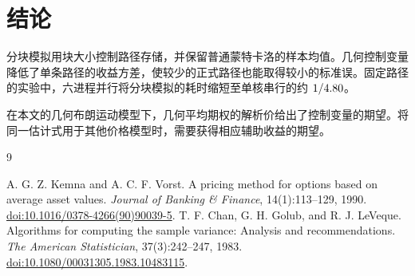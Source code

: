 \FloatBarrier
\section{结论}
分块模拟用块大小控制路径存储，并保留普通蒙特卡洛的样本均值。几何控制变量降低了单条路径的收益方差，使较少的正式路径也能取得较小的标准误。固定路径的实验中，六进程并行将分块模拟的耗时缩短至单核串行的约 \(1/4.80\)。

在本文的几何布朗运动模型下，几何平均期权的解析价给出了控制变量的期望。将同一估计式用于其他价格模型时，需要获得相应辅助收益的期望。

\begin{thebibliography}{9}\small\raggedright
{}
A. G. Z. Kemna and A. C. F. Vorst.
A pricing method for options based on average asset values.
\textit{Journal of Banking \& Finance}, 14(1):113--129, 1990.
\href{https://doi.org/10.1016/0378-4266(90)90039-5}{doi:10.1016/0378-4266(90)90039-5}.
T. F. Chan, G. H. Golub, and R. J. LeVeque.
Algorithms for computing the sample variance: Analysis and recommendations.
\textit{The American Statistician}, 37(3):242--247, 1983.
\href{https://doi.org/10.1080/00031305.1983.10483115}{doi:10.1080/00031305.1983.10483115}.
\end{thebibliography}
